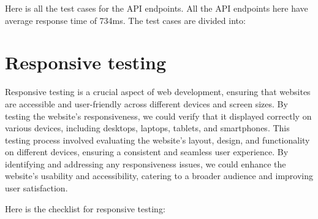 Here is all the test cases for the API endpoints. All the API endpoints
here have average response time of 734ms. The test cases are divided into:






















\section{Responsive testing}
Responsive testing is a crucial aspect of web development, ensuring that
websites are accessible and user-friendly across different devices and
screen sizes. By testing the website's responsiveness, we could verify
that it displayed correctly on various devices, including desktops,
laptops, tablets, and smartphones. This testing process involved
evaluating the website's layout, design, and functionality on different
devices, ensuring a consistent and seamless user experience. By
identifying and addressing any responsiveness issues, we could enhance
the website's usability and accessibility, catering to a broader audience
and improving user satisfaction.

Here is the checklist for responsive testing:


